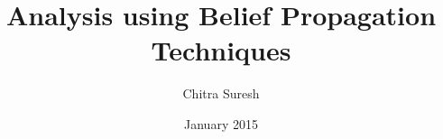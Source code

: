 \clearpage%

\title{Analysis using Belief Propagation Techniques}
\author{Chitra Suresh}

\date{January 2015}



\maketitle

